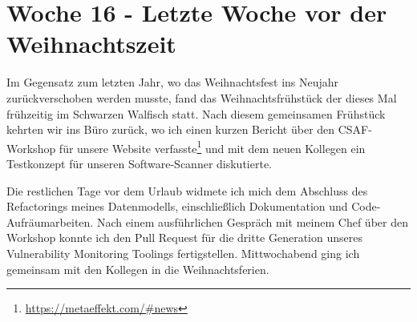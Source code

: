 \section{Woche 16 - Letzte Woche vor der Weihnachtszeit} \label{sec:bericht-wo-16}


\lweekdaymarginpar{\weekdayMondayLong}

Im Gegensatz zum letzten Jahr, wo das Weihnachtsfest ins Neujahr zurückverschoben werden musste, fand das Weihnachtsfrühstück der \metaeffekt dieses Mal frühzeitig im Schwarzen Walfisch statt.
Nach diesem gemeinsamen Frühstück kehrten wir ins Büro zurück, wo ich einen kurzen Bericht über den CSAF-Workshop für unsere Website verfasste\footnote{\url{https://metaeffekt.com/\#news}} und mit dem neuen Kollegen ein Testkonzept für unseren Software-Scanner diskutierte.

\sweekdaymarginpar{\weekdayTuesdayShort, \weekdayWednesdayShort}

Die restlichen Tage vor dem Urlaub widmete ich mich dem Abschluss des Refactorings meines Datenmodells, einschließlich Dokumentation und Code-Aufräumarbeiten.
Nach einem ausführlichen Gespräch mit meinem Chef über den Workshop konnte ich den Pull Request für die dritte Generation unseres Vulnerability Monitoring Toolings fertigstellen.
Mittwochabend ging ich gemeinsam mit den Kollegen in die Weihnachtsferien.
